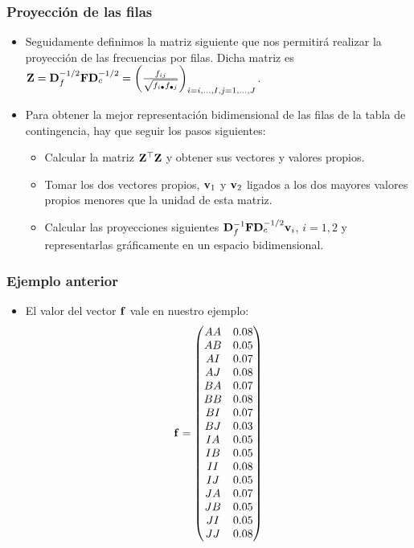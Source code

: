 \begin{frame}
\frametitle{Proyección de las filas}
\begin{itemize}
\item<2->{Seguidamente definimos la matriz siguiente que nos permitirá realizar la proyección de las frecuencias por filas. Dicha matriz es $\mathbf{Z}=\mathbf{D}_f^{-1/2}\mathbf{F}\mathbf{D}_c^{-1/2}=\left(\frac{f_{ij}}{\sqrt{f_{i\bullet}f_{\bullet j}}}\right)_{i=i,\ldots,I,j=1,\ldots,J}$.}
\item<3->{Para obtener la mejor representación bidimensional de las filas de la tabla de contingencia, hay que seguir los pasos siguientes:
\begin{itemize}
\item<4->{Calcular la matriz $\mathbf{Z}^\top\mathbf{Z}$ y obtener sus vectores y valores propios.}
\item<5->{Tomar los dos vectores propios, $\mathbf{v}_1$ y $\mathbf{v}_2$ ligados a los dos mayores valores propios menores que la unidad de esta matriz.}
\item<6->{Calcular las proyecciones siguientes $\mathbf{D}_f^{-1}\mathbf{F}\mathbf{D}_c^{-1/2}\mathbf{v}_i$, $i=1,2$ y representarlas gráficamente en un espacio bidimensional.}
\end{itemize}}
\end{itemize}
\end{frame}
\begin{frame}
\frametitle{Ejemplo anterior}
\begin{itemize}
\item<2->{El valor del vector $\mathbf{f}$ vale en nuestro ejemplo:
$$
\mathbf{f}=\begin{pmatrix}
A A & 0.08 \\
  A B & 0.05 \\
  A I & 0.07 \\
  A J & 0.08 \\
  B A & 0.07 \\
  B B & 0.08 \\
  B I & 0.07 \\
  B J & 0.03 \\
  I A & 0.05 \\
  I B & 0.05 \\
  I I & 0.08 \\
  I J & 0.05 \\
  J A & 0.07 \\
  J B & 0.05 \\
  J I & 0.05 \\
  J J & 0.08
\end{pmatrix}
$$}
\end{itemize}
\end{frame}

